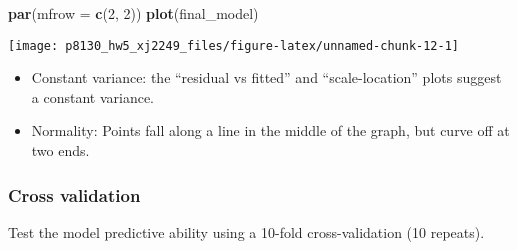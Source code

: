\documentclass[]{article}
\newenvironment{Shaded}{\begin{snugshade}}{\end{snugshade}}
\newcommand{\CommentTok}[1]{\textcolor[rgb]{0.56,0.35,0.01}{\textit{#1}}}
\newcommand{\DataTypeTok}[1]{\textcolor[rgb]{0.13,0.29,0.53}{#1}}
\newcommand{\DecValTok}[1]{\textcolor[rgb]{0.00,0.00,0.81}{#1}}
\newcommand{\KeywordTok}[1]{\textcolor[rgb]{0.13,0.29,0.53}{\textbf{#1}}}
\newcommand{\NormalTok}[1]{#1}
\newcommand{\OperatorTok}[1]{\textcolor[rgb]{0.81,0.36,0.00}{\textbf{#1}}}
\newcommand{\StringTok}[1]{\textcolor[rgb]{0.31,0.60,0.02}{#1}}
\providecommand{\tightlist}{%
  \setlength{\itemsep}{0pt}\setlength{\parskip}{0pt}}
\begin{document}
\begin{Shaded}
\begin{Highlighting}[]
\KeywordTok{par}\NormalTok{(}\DataTypeTok{mfrow =} \KeywordTok{c}\NormalTok{(}\DecValTok{2}\NormalTok{, }\DecValTok{2}\NormalTok{))}
\KeywordTok{plot}\NormalTok{(final_model)}
\end{Highlighting}
\end{Shaded}

\texttt{[image: p8130\_hw5\_xj2249\_files/figure-latex/unnamed-chunk-12-1]}

\begin{itemize}
\tightlist
\item
  Constant variance: the ``residual vs fitted'' and ``scale-location''
  plots suggest a constant variance.
\item
  Normality: Points fall along a line in the middle of the graph, but
  curve off at two ends.
\end{itemize}

\hypertarget{cross-validation}{%
\subsubsection{Cross validation}\label{cross-validation}}

Test the model predictive ability using a 10-fold cross-validation (10
repeats).

\begin{Shaded}
\end{Shaded}
\end{document}
